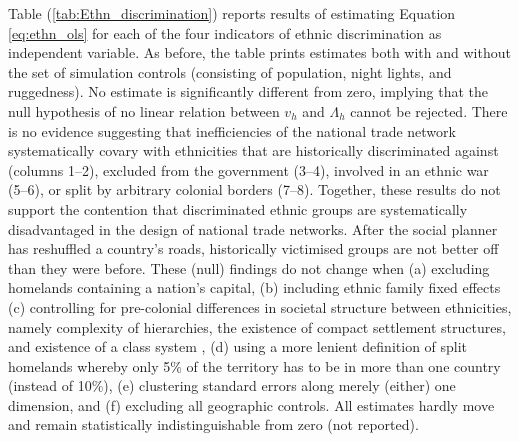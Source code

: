 \documentclass[11pt, oneside]{article}   	%
\let\oldref\ref
\renewcommand{\ref}[1]{(\oldref{#1})}
\begin{document}
Table \ref{tab:Ethn_discrimination} reports results of estimating Equation \eqref{eq:ethn_ols} for each of the four indicators of ethnic discrimination as independent variable. As before, the table prints estimates both with and without the set of simulation controls (consisting of population, night lights, and ruggedness). No estimate is significantly different from zero, implying that the null hypothesis of no linear relation between $v_{h}$ and $\Lambda_{h}$ cannot be rejected. There is no evidence suggesting that inefficiencies of the national trade network systematically covary with ethnicities that are historically discriminated against (columns 1--2), excluded from the government (3--4), involved in an ethnic war (5--6), or split by arbitrary colonial borders (7--8). Together, these results do not support the contention that discriminated ethnic groups are systematically disadvantaged in the design of national trade networks. After the social planner has reshuffled a country's roads, historically victimised groups are not better off than they were before. These (null) findings do not change when (a) excluding homelands containing a nation's capital, (b) including ethnic family fixed effects (c) controlling for pre-colonial differences in societal structure between ethnicities, namely complexity of hierarchies, the existence of compact settlement structures, and existence of a class system \citep{Michalopoulos_PreColonialEthnicInstitutions_2013}, (d) using a more lenient definition of split homelands whereby only 5\% of the territory has to be in more than one country (instead of 10\%), (e) clustering standard errors along merely (either) one dimension, and (f) excluding all geographic controls. All estimates hardly move and remain statistically indistinguishable from zero (not reported).
\end{document}
